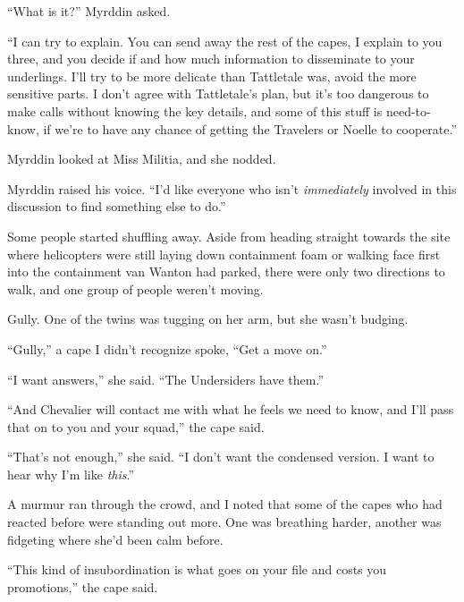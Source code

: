 ``What is it?'' Myrddin asked.



``I can try to explain.  You can send away the rest of the capes, I explain to you three, and you decide if and how much information to disseminate to your underlings.  I'll try to be more delicate than Tattletale was, avoid the more sensitive parts.  I don't agree with Tattletale's plan, but it's too dangerous to make calls without knowing the key details, and some of this stuff is need-to-know, if we're to have any chance of getting the Travelers or Noelle to cooperate.''



Myrddin looked at Miss Militia, and she nodded.



Myrddin raised his voice.  ``I'd like everyone who isn't \emph{immediately} involved in this discussion to find something else to do.''



Some people started shuffling away.  Aside from heading straight towards the site where helicopters were still laying down containment foam or walking face first into the containment van Wanton had parked, there were only two directions to walk, and one group of people weren't moving.



Gully.  One of the twins was tugging on her arm, but she wasn't budging.



``Gully,'' a cape I didn't recognize spoke, ``Get a move on.''



``I want answers,'' she said.  ``The Undersiders have them.''



``And Chevalier will contact me with what he feels we need to know, and I'll pass that on to you and your squad,'' the cape said.



``That's not enough,'' she said.  ``I don't want the condensed version.  I want to hear why I'm like \emph{this}.''



A murmur ran through the crowd, and I noted that some of the capes who had reacted before were standing out more.  One was breathing harder, another was fidgeting where she'd been calm before.



``This kind of insubordination is what goes on your file and costs you promotions,'' the cape said.



